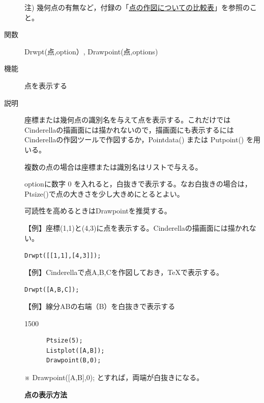 \documentclass[papersize,a4paper,12pt,uplatex]{jsarticle}
\begin{document}
\begin{description}
 \begin{center}  \end{center}

注) 幾何点の有無など，付録の「\hyperlink{mkpttable}{点の作図についての比較表}」を参照のこと。


\vspace{\baselineskip}
\hypertarget{drwpt}{}
\item[関数]  Drwpt(点,option）, Drawpoint(点,options)
\item[機能]  点を表示する
\item[説明]  座標または幾何点の識別名を与えて点を表示する。これだけではCinderellaの描画面には描かれないので，描画面にも表示するにはCinderellaの作図ツールで作図するか，Pointdata() または Putpoint() を用いる。

複数の点の場合は座標または識別名はリストで与える。

optionに数字 0 を入れると，白抜きで表示する。なお白抜きの場合は，Ptsize()で点の大きさを少し大きめにとるとよい。

可読性を高めるときはDrawpointを推奨する。

\vspace{\baselineskip}
【例】座標(1,1)と(4,3)に点を表示する。Cinderellaの描画面には描かれない。

\hspace{10mm} \verb|Drwpt([[1,1],[4,3]]);|

\vspace{\baselineskip}
【例】Cinderellaで点A,B,Cを作図しておき，\TeX で表示する。

\hspace{10mm} \verb|Drwpt([A,B,C]); |

\vspace{\baselineskip}
【例】線分ABの右端（B）を白抜きで表示する

\begin{layer}{150}{0}
\end{layer}
\begin{verbatim}
      Ptsize(5);
      Listplot([A,B]);
      Drawpoint(B,0);
\end{verbatim}

※  Drawpoint([A,B],0);  とすれば，両端が白抜きになる。

\vspace{\baselineskip}
{\bf 点の表示方法}


\end{description}
\end{document}
